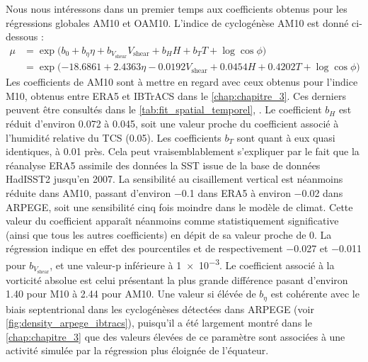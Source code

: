 \documentclass[../main.tex]{subfiles}
\begin{document}
Nous nous intéressons dans un premier temps aux coefficients obtenus pour les régressions globales AM10 et OAM10. L'indice de cyclogénèse AM10 est donné
ci-dessous :
%
\begin{align*}
\tag{AM10}
    \mu &= \exp \big( b_0 + b_\eta \eta + b_{V_{\mathrm{shear}}} V_{\mathrm{shear}} + b_H H + b_T T + \log \cos \phi \big)\\
        &= \exp \big( \num{-18.6861} + \num{2.4363} \eta - \num{0.0192} V_{\mathrm{shear}} + \num{0.0454} H + \num{0.4202} T + \log \cos \phi \big)
\end{align*}
%
Les coefficients de AM10 sont à mettre en regard avec ceux obtenus pour l'indice M10, obtenus entre ERA5 et IBTrACS dans le \cref{chap:chapitre_3}. Ces derniers
peuvent être consultés dans le \cref{tab:fit_spatial_temporel}, . Le coefficient $b_H$ est réduit d'environ \num{0.072} à
\num{0.045}, soit une valeur proche du coefficient associé à l'humidité relative du TCS (\num{0.05}). Les coefficients $b_T$ sont quant à eux quasi identiques,
à \num{0.01} près. Cela peut vraisemblablement s'expliquer par le fait que la réanalyse ERA5 assimile des données la SST issue de la base de données HadISST2
jusqu'en \num{2007}. La sensibilité au cisaillement vertical est néanmoins réduite dans AM10, passant d'environ \num{-0.1} dans ERA5 à environ \num{-0.02} dans
ARPEGE, soit une sensibilité cinq fois moindre dans le modèle de climat. Cette valeur du coefficient apparaît néanmoins comme statistiquement significative
(ainsi que tous les autres coefficients) en dépit de sa valeur proche de \num{0}. La régression indique en effet des pourcentiles  et  de
respectivement \num{-0.027} et \num{-0.011} pour $b_{V_{\mathrm{shear}}}$, et une valeur-p inférieure à \num{1e-3}. Le coefficient associé à la vorticité
absolue est celui présentant la plus grande différence pasant d'environ \num{1.40} pour M10 à \num{2.44} pour AM10. Une valeur si élévée de $b_\eta$ est
cohérente avec le biais septentrional dans les cyclogénèses détectées dans ARPEGE (voir \cref{fig:density_arpege_ibtracs}), puisqu'il a été largement montré
dans le \cref{chap:chapitre_3} que des valeurs élevées de ce paramètre sont associées à une activité simulée par la régression plus éloignée de l'équateur.
\end{document}
